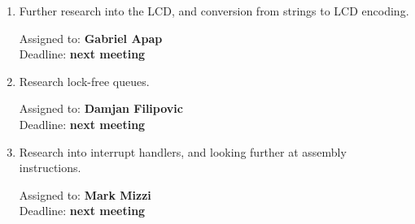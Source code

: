 \documentclass[11pt,a4paper]{scrartcl}
\begin{document}
\begin{enumerate}

\item Further research into the LCD, and conversion from strings to LCD encoding.
\begin{flushright}
Assigned to: \textbf{Gabriel Apap} \\
Deadline: \textbf{next meeting}
\end{flushright}

\item Research lock-free queues.
\begin{flushright}
Assigned to: \textbf{Damjan Filipovic} \\
Deadline: \textbf{next meeting}
\end{flushright}

\item Research into interrupt handlers, and looking further at assembly instructions.
\begin{flushright}
Assigned to: \textbf{Mark Mizzi} \\
Deadline: \textbf{next meeting}
\end{flushright}


\end{enumerate}
\end{document}
